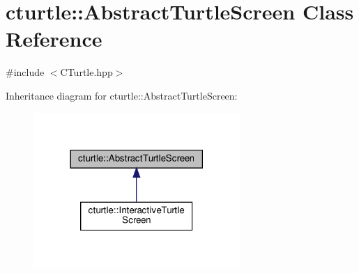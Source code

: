 \hypertarget{classcturtle_1_1AbstractTurtleScreen}{}\section{cturtle\+:\+:Abstract\+Turtle\+Screen Class Reference}
\label{classcturtle_1_1AbstractTurtleScreen}


{\ttfamily \#include $<$C\+Turtle.\+hpp$>$}



Inheritance diagram for cturtle\+:\+:Abstract\+Turtle\+Screen\+:
\nopagebreak
\begin{figure}[H]
\begin{center}
\leavevmode
\includegraphics[width=222pt]{classcturtle_1_1AbstractTurtleScreen__inherit__graph}
\end{center}
\end{figure}
